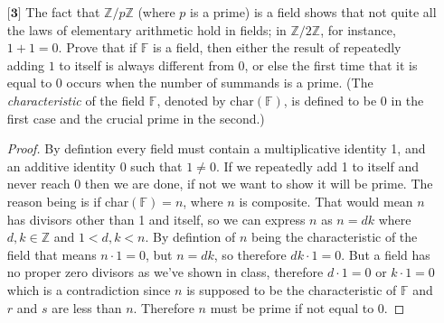 \documentclass[12pt]{article}
\newcommand      {\Zm}         {{\mathbb Z}}
\newcommand      {\Qm}         {{\mathbb Q}}
\newcommand      {\Fm}         {{\mathbb F}}
\begin{document}
\begin{itemize}
\begin{itemize}
\begin{proof}
        \newpage %

        \textit{Distrubitve Property:} We see for $x,y,\ z \in \Qm(\sqrt{2})$,
        \begin{align*}
            x\cdot (y + z) &= (a_1 + b_1(\sqrt{2})) \cdot ((a_2 + b_2(\sqrt{2})) + (a_3 + b_3(\sqrt{2}))) \\
            &= (a_1 + b_1(\sqrt{2})) \cdot ((a_2 + a_3) + (b_2 + b_3)\sqrt{2}) \\
            &= a_1(a_2 + a_3) + b_1(b_2 + b_3)\sqrt{2} && \text{Distrubition holds in $\Qm$}\\
            &= (a_1a_2 + a_1a_3) + (b_1b_2 + b_1b_3)\sqrt{2} \\
            &= (a_1 + b_1\sqrt{2})(a_2 + b_2\sqrt{2}) + (a_1 + b_1\sqrt{2})(a_3 + b_3\sqrt{2}) \\
            &= xy + xz
        \end{align*}

        We can see $\Qm(\sqrt{2})$ does indeed form a field. 
    \end{proof}
    
    \end{itemize}
    
    \vspace{.5cm}
    
    \item[$\textbf{[3]}$]%
    The fact that $\mathbb{Z}/p\mathbb{Z}$ (where $p$ is a prime) is a field shows that not quite all the laws of elementary arithmetic hold in fields; in $\mathbb{Z}/2\mathbb{Z}$, for instance, $1 + 1 = 0$. Prove that if $\mathbb{F}$ is a field, then either the result of repeatedly adding $1$ to itself is always different from $0$, or else the first time that it is equal to $0$ occurs when the number of summands is a prime. (The \textit{characteristic} of the field $\mathbb{F}$, denoted by $\text{char}(\mathbb{F})$, is defined to be $0$ in the first case and the crucial prime in the second.) 
    
    \begin{proof}
        By defintion every field must contain a multiplicative identity 1, and an additive identity 0 such that $1\neq 0$. If we repeatedly add 1 to itself and never reach 0 then we are done, if not we want to show it will be prime. The reason being is if char$(\Fm)=n$, where $n$ is composite. That would mean $n$ has divisors other than 1 and itself, so we can express $n$ as $n = dk $ where $d,k \in \Zm$ and $1 < d,k < n$. By defintion of $n$ being the characteristic of the field that means $n\cdot 1 = 0$, but $n = dk$, so therefore $dk \cdot 1 = 0$. But a field has no proper zero divisors as we've shown in class, therefore $d\cdot 1 = 0$ or $k \cdot 1 = 0$ which is a contradiction since $n$ is supposed to be the characteristic of $\Fm$ and $r$ and $s$ are less than $n$. Therefore $n$ must be prime if not equal to 0.



\end{proof}
\end{itemize}
\end{document}
